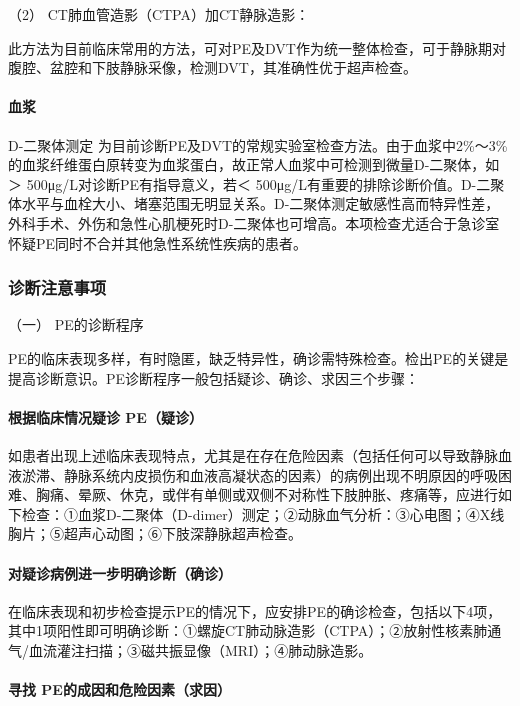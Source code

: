 \hypertarget{text00278.htmlux5cux23CHP9-8-2-2-8-2}{}
（2） CT肺血管造影（CTPA）加CT静脉造影：

此方法为目前临床常用的方法，可对PE及DVT作为统一整体检查，可于静脉期对腹腔、盆腔和下肢静脉采像，检测DVT，其准确性优于超声检查。

\paragraph{血浆}

D-二聚体测定
为目前诊断PE及DVT的常规实验室检查方法。由于血浆中2\%～3\%的血浆纤维蛋白原转变为血浆蛋白，故正常人血浆中可检测到微量D-二聚体，如＞
500μg/L对诊断PE有指导意义，若＜
500μg/L有重要的排除诊断价值。D-二聚体水平与血栓大小、堵塞范围无明显关系。D-二聚体测定敏感性高而特异性差，外科手术、外伤和急性心肌梗死时D-二聚体也可增高。本项检查尤适合于急诊室怀疑PE同时不合并其他急性系统性疾病的患者。

\subsubsection{诊断注意事项}

\hypertarget{text00278.htmlux5cux23CHP9-8-2-3-1}{}
（一） PE的诊断程序

PE的临床表现多样，有时隐匿，缺乏特异性，确诊需特殊检查。检出PE的关键是提高诊断意识。PE诊断程序一般包括疑诊、确诊、求因三个步骤：

\paragraph{根据临床情况疑诊 PE（疑诊）}

如患者出现上述临床表现特点，尤其是在存在危险因素（包括任何可以导致静脉血液淤滞、静脉系统内皮损伤和血液高凝状态的因素）的病例出现不明原因的呼吸困难、胸痛、晕厥、休克，或伴有单侧或双侧不对称性下肢肿胀、疼痛等，应进行如下检查：①血浆D-二聚体（D-dimer）测定；②动脉血气分析：③心电图；④X线胸片；⑤超声心动图；⑥下肢深静脉超声检查。

\paragraph{对疑诊病例进一步明确诊断（确诊）}

在临床表现和初步检查提示PE的情况下，应安排PE的确诊检查，包括以下4项，其中1项阳性即可明确诊断：①螺旋CT肺动脉造影（CTPA）；②放射性核素肺通气/血流灌注扫描；③磁共振显像（MRI）；④肺动脉造影。

\paragraph{寻找 PE的成因和危险因素（求因）}

